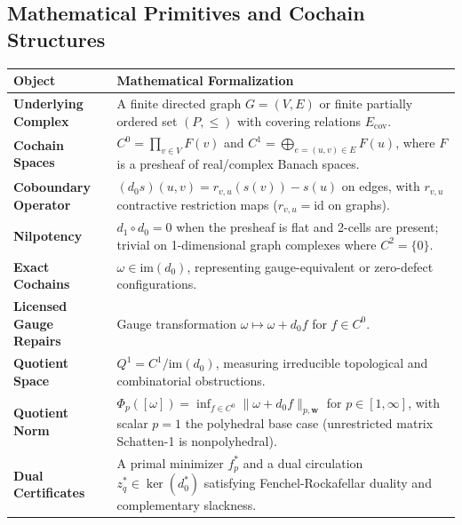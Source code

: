 \documentclass[
]{article}
\begin{document}
\subsection{Mathematical Primitives and Cochain Structures}\label{mathematical-primitives-and-cochain-structures}

\begin{longtable}[]{@{}
  >{\raggedright\arraybackslash}p{}
  >{\raggedright\arraybackslash}p{}@{}}
\toprule\noalign{}
\begin{minipage}[b]{\linewidth}\raggedright
Object
\end{minipage} & \begin{minipage}[b]{\linewidth}\raggedright
Mathematical Formalization
\end{minipage} \\
\midrule\noalign{}
\endhead
\bottomrule\noalign{}
\endlastfoot
\textbf{Underlying Complex} & A finite directed graph \(G = (V, E)\) or finite partially ordered set \((P, \le)\) with covering relations \(E_{\mathrm{cov}}\). \\
\textbf{Cochain Spaces} & \(C^0 = \prod_{v \in V} F(v)\) and \(C^1 = \bigoplus_{e=(u,v) \in E} F(u)\), where \(F\) is a presheaf of real/complex Banach spaces. \\
\textbf{Coboundary Operator} & \((d_0 s)(u,v) = r_{v,u}(s(v)) - s(u)\) on edges, with \(r_{v,u}\) contractive restriction maps (\(r_{v,u} = \mathrm{id}\) on graphs). \\
\textbf{Nilpotency} & \(d_1 \circ d_0 = 0\) when the presheaf is flat and 2-cells are present; trivial on 1-dimensional graph complexes where \(C^2 = \{0\}\). \\
\textbf{Exact Cochains} & \(\omega \in \mathrm{im}(d_0)\), representing gauge-equivalent or zero-defect configurations. \\
\textbf{Licensed Gauge Repairs} & Gauge transformation \(\omega \mapsto \omega + d_0 f\) for \(f \in C^0\). \\
\textbf{Quotient Space} & \(Q^1 = C^1 / \mathrm{im}(d_0)\), measuring irreducible topological and combinatorial obstructions. \\
\textbf{Quotient Norm} & \(\Phi_p([\omega]) = \inf_{f \in C^0} \|\omega + d_0 f\|_{p,\mathbf{w}}\) for \(p \in [1, \infty]\), with scalar \(p=1\) the polyhedral base case (unrestricted matrix Schatten-1 is nonpolyhedral). \\
\textbf{Dual Certificates} & A primal minimizer \(f_p^*\) and a dual circulation \(z_q^* \in \ker(d_0^*)\) satisfying Fenchel-Rockafellar duality and complementary slackness. \\

\end{longtable}
\end{document}

